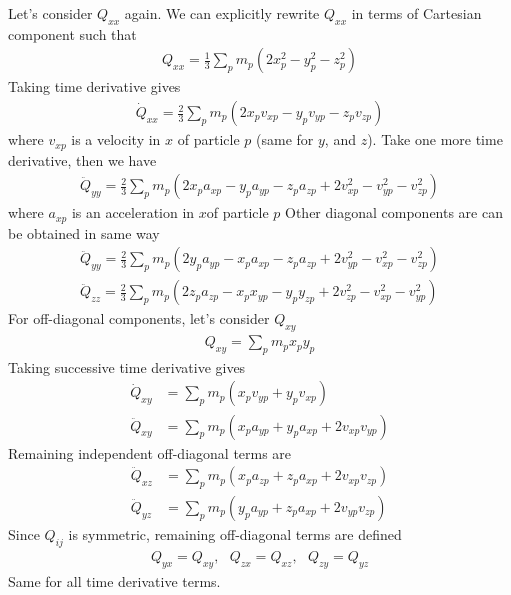 \documentclass{article}
\begin{document}
Let's consider $Q_{xx}$ again. We can explicitly rewrite $Q_{xx}$ in terms of Cartesian component such that
\begin{align}
Q_{xx} = \frac{1}{3} \sum_p m_p (2x_p^2 - y_p^2 - z_p^2) 
\end{align}
Taking time derivative gives
\begin{align}
\dot{Q}_{xx} = \frac{2}{3} \sum_p m_p (2 x_p v_{xp} - y_p v_{yp} - z_p v_{zp})
\end{align}
where $v_{xp}$ is a velocity in $x$ of particle $p$ (same for $y$, and $z$). Take one more time derivative, then we have
\begin{align}
\ddot{Q}_{yy} = \frac{2}{3} \sum_p m_p (2 x_p a_{xp} - y_p a_{yp} - z_p a_{zp} + 2 v^2_{xp} - v^2_{yp} - v^2_{zp})
\end{align}
where $a_{xp}$ is an acceleration in $x$of particle $p$ Other diagonal components are can be obtained in same way
\begin{align}
\ddot{Q}_{yy} = \frac{2}{3} \sum_p m_p (2 y_p a_{yp} - x_p a_{xp} - z_p a_{zp} + 2 v^2_{yp} - v^2_{xp} - v^2_{zp}) \\
\ddot{Q}_{zz} = \frac{2}{3} \sum_p m_p (2 z_p a_{zp} - x_p x_{yp} - y_p y_{zp} + 2 v^2_{zp} - v^2_{xp} - v^2_{yp})
\end{align}
For off-diagonal components, let's consider $Q_{xy}$
\begin{align}
Q_{xy} = \sum_p m_p x_p y_p
\end{align}
Taking successive time derivative gives
\begin{align}
\dot{Q}_{xy} &= \sum_p m_p (x_p v_{yp} + y_p v_{xp})\\
\ddot{Q}_{xy} &= \sum_p m_p ( x_p a_{yp} + y_p a_{xp} + 2 v_{xp} v_{yp})
\end{align}
Remaining independent off-diagonal terms are
\begin{align}
\ddot{Q}_{xz} &= \sum_p m_p ( x_p a_{zp} + z_p a_{xp} + 2 v_{xp} v_{zp})\\
\ddot{Q}_{yz} &= \sum_p m_p ( y_p a_{yp} + z_p a_{xp} + 2 v_{yp} v_{zp})
\end{align}
Since $Q_{ij}$ is symmetric, remaining off-diagonal terms are defined
\begin{align}
Q_{yx} = Q_{xy}, \,\,\,\, Q_{zx} = Q_{xz}, \,\,\,\, Q_{zy} = Q_{yz}
\end{align}
Same for all time derivative terms.
\end{document}
